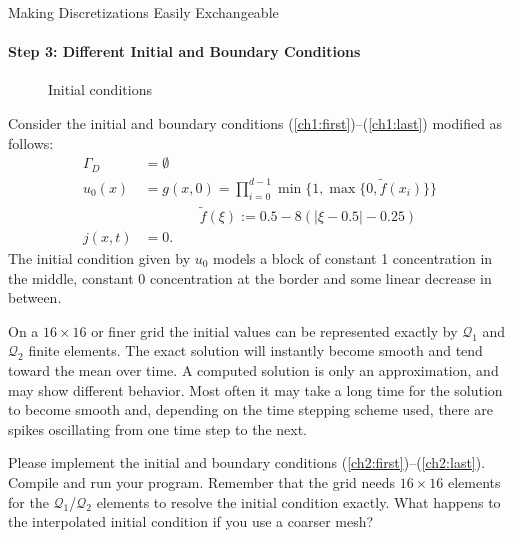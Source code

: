 \documentclass[12pt,a4paper]{article}
\begin{document}
\begin{Exercise}{Making Discretizations Easily Exchangeable}
  \paragraph{Step 3: Different Initial and Boundary Conditions}
  \quad \newline
  \begin{wrapfigure}[9]{l}{4.5cm}
    \centering
    \caption{Initial conditions}
  \end{wrapfigure}
  Consider the initial and boundary conditions
  (\ref{ch1:first})--(\ref{ch1:last}) modified as follows:
  \begin{align}
    \label{ch2:first}
    \Gamma_D&=\emptyset \\
    u_0(x) &= g(x, 0) = \prod_{i=0}^{d-1}\min\{1,\max\{0,\tilde{f}(x_i)\}\} \\
        & \qquad\qquad \tilde{f}(\xi):=0.5-8(|\xi-0.5|-0.25) \nonumber \\
    \label{ch2:last}
    j(x,t)&=0 .
  \end{align}
  The initial condition given by $u_0$ models a block of constant 1
  concentration in the middle, constant 0 concentration at the border
  and some linear decrease in between.

  On a $16\times16$ or finer grid the initial values can be represented
  exactly by $\mathcal{Q}_1$ and $\mathcal{Q}_2$ finite elements.
  The exact solution will instantly
  become smooth and tend toward the mean over time.  A computed solution is
  only an approximation, and may show different behavior.  Most often it may
  take a long time for the solution to become smooth and, depending on
  the time stepping scheme used, there are spikes oscillating from one
  time step to the next.

  Please implement the initial and boundary conditions
  (\ref{ch2:first})--(\ref{ch2:last}). Compile and run your program.
  Remember that the grid needs $16\times16$ elements for the
  $\mathcal{Q}_1$/$\mathcal{Q}_2$ elements to resolve the initial
  condition exactly.  What happens to the interpolated initial condition
  if you use a coarser mesh?


\end{Exercise}
\end{document}
